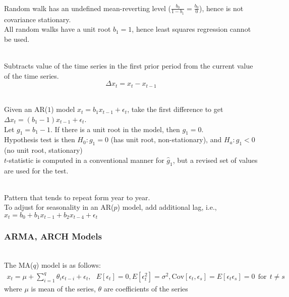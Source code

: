 \begin{remark} \\
Random walk has an undefined mean-reverting level ($\frac{b_0}{1-b_1} = \frac{b_0}{0}$), hence is not covariance stationary.\\
All random walks have a unit root $b_1 = 1$, hence least squares regression cannot be used.
\end{remark}

\begin{definition} \\
Subtracts value of the time series in the first prior period from the current value of the time series.
\begin{equation}
\Delta x_t = x_t - x_{t-1} \nonumber
\end{equation}
\end{definition}

\begin{remark} \\
Given an AR($1$) model $x_t = b_1 x_{t-1} + \epsilon_t$, take the first difference to get $\Delta x_t = (b_1 - 1)x_{t-1} + \epsilon_t$.\\
Let $g_1 = b_1 -1 $. If there is a unit root in the model, then $g_1 = 0$.\\
Hypothesis test is then $H_0: g_1 = 0$ (has unit root, non-stationary), and $H_a: g_1 < 0$ (no unit root, stationary)\\
$t$-statistic is computed in a conventional manner for $\hat{g}_1$, but a revised set of values are used for the test.
\end{remark}

\begin{remark} \\
Pattern that tends to repeat form year to year.\\
To adjust for seasonality in an AR($p$) model, add additional lag, i.e., $x_t = b_0 + b_1 x_{t-1} + b_2 x_{t-4} + \epsilon_t$
\end{remark}

\subsubsection{ARMA, ARCH Models}

\begin{definition} \\
The MA($q$) model is as follows:
\begin{align}
x_t = \mu + \sum\limits_{i=1}^q \theta_i \epsilon_{t-i} + \epsilon_t, \ \ \ E[\epsilon_t] = 0, E[\epsilon_t^2] = \sigma^2, \text{Cov}[\epsilon_t, \epsilon_s] = E[\epsilon_t \epsilon_s] = 0 \ \ \text{for} \ \ t \neq s \nonumber
\end{align}
where $\mu$ is mean of the series, $\theta$ are coefficients of the series
\end{definition}

